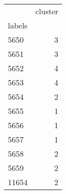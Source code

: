 \begin{tabular}{lr}
\toprule
{} &  cluster \\
labels &          \\
\midrule
5650   &        3 \\
5651   &        3 \\
5652   &        4 \\
5653   &        4 \\
5654   &        2 \\
5655   &        1 \\
5656   &        1 \\
5657   &        1 \\
5658   &        2 \\
5659   &        2 \\
11654  &        2 \\
\bottomrule
\end{tabular}
